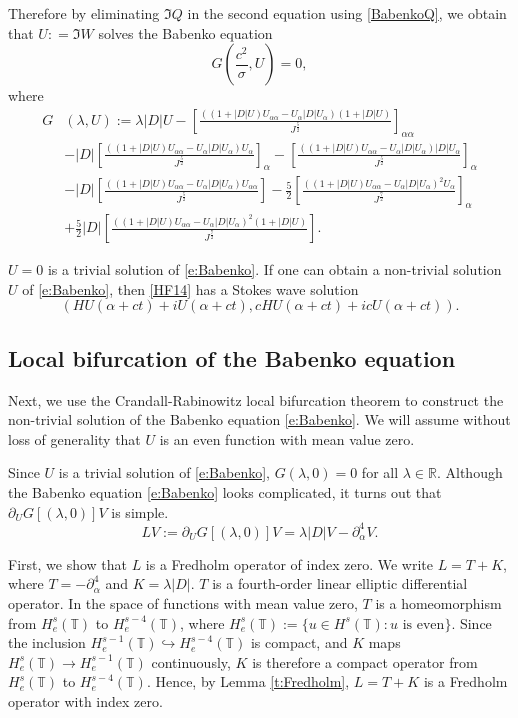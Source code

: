 \documentclass[12pt]{amsart}
\theoremstyle{remark}
\theoremstyle{definition}
\numberwithin{equation}{section}
\newcommand{\p}{\partial}
\newcommand{\R}{\mathbb{R}}
\newcommand{\T}{\mathbb{T}}
\newcommand{\al}{\alpha}
\newcommand{\f}{\frac}
\begin{document}
Therefore by eliminating $\Im Q$ in the second equation using \eqref{BabenkoQ}, we obtain that $U: =\Im W$ solves the Babenko equation
\begin{equation} \label{e:Babenko}
  G\left(\frac{c^2}{\sigma}, U \right) = 0,  
\end{equation}
where
\begin{align*}
G&\left(\lambda, U \right) := \lambda |D|U-\left[\frac{((1+|D|U)  U_{\al \al} -U_\al |D|U_\al)(1+|D|U)}{J^\f52}\right]_{\al\al} \\
&-|D|\left[\frac{((1+|D|U) U_{\al \al} - U_\al |D|U_\al)U_{\al}}{J^\f52}\right]_{\al}-\left[\frac{((1+|D|U) U_{\al \al} - U_\al |D|U_\al)|D|U_{\al}}{J^\f52}\right]_{\al} \\
&-|D|\left[\frac{((1+|D|U) U_{\al \al} - U_\al |D|U_\al)U_{\al\al}}{J^\f52}\right]-\f52\left[\frac{((1+|D|U) U_{\al \al} -U_\al |D|U_\al)^2U_{\al}}{J^\f72}\right]_{\al} \\
&+\f52|D|\left[\frac{((1+|D|U) U_{\al \al} - U_\al |D|U_\al)^2(1+|D|U)}{J^\f72}\right] .
\end{align*}


$U = 0$ is a trivial solution of \eqref{e:Babenko}. 
If one can obtain a non-trivial solution $U$ of \eqref{e:Babenko}, then \eqref{HF14} has a Stokes wave solution
\begin{equation*}
    \left( HU(\alpha + ct) + iU(\alpha + ct),   cHU(\alpha + ct)+icU(\alpha + ct)\right).
\end{equation*}

\subsection{Local bifurcation of the Babenko equation}
Next, we use the Crandall-Rabinowitz local bifurcation theorem to construct the non-trivial solution of the Babenko equation \eqref{e:Babenko}.
We will assume without loss of generality that $U$ is an even function with mean value zero.

Since $U$ is a trivial solution of \eqref{e:Babenko}, $G(\lambda, 0) = 0$ for all $\lambda \in \R$.
Although the Babenko equation \eqref{e:Babenko} looks complicated, it turns out that $\partial_U G[(\lambda, 0)]V$ is simple.
\begin{equation*}
LV := \partial_U G[(\lambda, 0)]V =  \lambda |D|V - \p_\al^4 V.
\end{equation*}

First, we show that $L$ is a Fredholm operator of index zero.
We write $L = T + K$, where $T = - \p_\al^4$ and $K = \lambda|D|$.
$T$ is a fourth-order linear elliptic differential operator. 
In the space of functions with mean value zero, $T$ is a homeomorphism from $H^s_e(\T)$ to $H_e^{s-4}(\T)$,  where $H^s_e(\T):=\{u\in H^s(\T): \text{$u$ is even}\}$. Since the inclusion $H_e^{s-1}(\T) \hookrightarrow H_e^{s-4}(\T)$ is compact, and $K$ maps $H_e^{s}(\T) \rightarrow H_e^{s-1}(\T)$ continuously, $K$ is therefore a compact operator from $H_e^s(\T)$ to $H_e^{s-4}(\T)$.
Hence, by Lemma \ref{t:Fredholm}, $L = T+K$ is a Fredholm operator with index zero.
\end{document}
